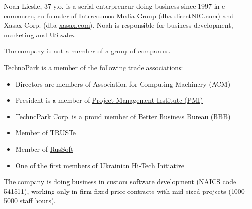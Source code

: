 Noah Lieske, 37 y.o.
is a serial enterpreneur doing business since 1997 in 
e-commerce, co-founder of Intercosmos Media Group (dba \href{http://www.directnic.com}{directNIC.com}) and 
Xasax Corp. (dba \href{http://www.xasax.com}{xasax.com}). Noah is responsible
for business development, marketing and US sales.

The company is not a member of a group of companies.


TechnoPark is a member of the following trade associations:
\begin{itemize}
	\item Directors are members of \href{http://www.acm.org}{Association for Computing Machinery (ACM)}
	\item President is a member of \href{http://www.pmi.org}{Project Management Institute (PMI)}
	\item TechnoPark Corp. is a proud member of \href{https://www.bbb.org/online/consumer/cks.aspx?ID=10805219819}{Better Business Bureau (BBB)}
	\item Member of \href{http://www.truste.org/ivalidate.php?url=www.technoparkcorp.com&amp;sealid=101}{TRUSTe}
	\item Member of \href{http://www.russoft.org}{RusSoft}
	\item One of the first members of \href{http://hi-tech.org.ua/Russian/about/members/index.html}{Ukrainian Hi-Tech Initiative}
\end{itemize}

The company is doing business in custom software development (NAICS code 541511), 
working only in firm fixed price contracts with mid-sized projects (1000--5000 staff hours).
